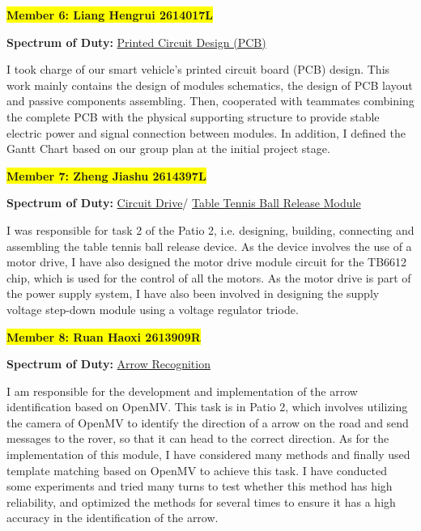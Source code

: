 \documentclass[12pt, a4paper, oneside]{report}
\begin{document}
\colorbox{yellow}{\textbf{Member 6: Liang Hengrui 2614017L} }
\begin{tcolorbox}
\textbf{Spectrum of Duty:} 
\hyperref[sec:PCB]{\textcolor{mybg}{Printed Circuit Design (PCB)}}
\end{tcolorbox}
I took charge of our smart vehicle's printed circuit board (PCB) design. This work mainly contains the design of modules schematics, the design of PCB layout and passive components assembling. Then, cooperated with teammates combining the complete PCB with the physical supporting structure to provide stable electric power and signal connection between modules. In addition, I defined the Gantt Chart based on our group plan at the initial project stage.
\vspace{\baselineskip}

\colorbox{yellow}{\textbf{Member 7: Zheng Jiashu 2614397L} }
\begin{tcolorbox}
\textbf{Spectrum of Duty:} 
\hyperref[sec:CD]{\textcolor{mybg}{Circuit Drive}}/
\hyperref[sec:tb]{\textcolor{mybg}{Table Tennis Ball Release Module}}
\end{tcolorbox}
I was responsible for task 2 of the Patio 2, i.e. designing, building, connecting and assembling the table tennis ball release device. As the device involves the use of a motor drive, I have also designed the motor drive module circuit for the TB6612 chip, which is used for the control of all the motors. As the motor drive is part of the power supply system, I have also been involved in designing the supply voltage step-down module using a voltage regulator triode.
\vspace{\baselineskip}

\colorbox{yellow}{\textbf{Member 8: Ruan Haoxi 2613909R} }
\begin{tcolorbox}
\textbf{Spectrum of Duty:} 
\hyperref[sec:Arrow]{\textcolor{mybg}{Arrow Recognition}}
\end{tcolorbox}
I am responsible for the development and implementation of the arrow identification based on OpenMV. This task is in Patio 2, which involves utilizing the camera of OpenMV to identify the direction of a arrow on the road and send messages to the rover, so that it can head to the correct direction. As for the implementation of this module, I have considered many methods and finally used template matching based on OpenMV to achieve this task. I have conducted some experiments and tried many turns to test whether this method has high reliability, and optimized the methods for several times to ensure it has a high accuracy in the identification of the arrow.
\vspace{\baselineskip}
\end{document}
